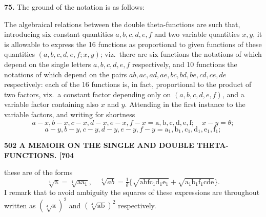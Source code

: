 \documentclass[11pt]{article}
\begin{document}
\medskip
\textbf{75.} The ground of the notation is as follows:

The algebraical relations between the double theta-functions are such that, introducing six constant quantities $a,b,c,d,e,f$ and two variable quantities $x,y$, it is allowable to express the 16 functions as proportional to given functions of these quantities $(a,b,c,d,e,f; x,y)$; viz.\ there are six functions the notations of which depend on the single letters $a,b,c,d,e,f$ respectively, and 10 functions the notations of which depend on the pairs $ab, ac, ad, ae, bc, bd, be, cd, ce, de$ respectively: each of the 16 functions is, in fact, proportional to the product of two factors, viz.\ a constant factor depending only on $(a,b,c,d,e,f)$, and a variable factor containing also $x$ and $y$. Attending in the first instance to the variable factors, and writing for shortness
\[
a-x, b-x, c-x, d-x, e-x, f-x = \mathrm{a}, \mathrm{b}, \mathrm{c}, \mathrm{d}, \mathrm{e}, \mathrm{f};\quad x-y = \theta;
\]
\[
a-y, b-y, c-y, d-y, e-y, f-y = \mathrm{a}_1, \mathrm{b}_1, \mathrm{c}_1, \mathrm{d}_1, \mathrm{e}_1, \mathrm{f}_1;
\]

\bigskip
\noindent\textbf{502 \hfill A MEMOIR ON THE SINGLE AND DOUBLE THETA-FUNCTIONS. \hfill [704}

\medskip
these are of the forms
\[
\sqrt[4]{\mathrm{a}} = \sqrt[4]{\mathrm{a}\mathrm{a}_1},\quad \sqrt[4]{ab} = \tfrac{1}{\theta}\{\sqrt{\mathrm{a}\mathrm{b}\mathrm{f}\mathrm{c}_1\mathrm{d}_1\mathrm{e}_1} + \sqrt{\mathrm{a}_1\mathrm{b}_1\mathrm{f}_1\mathrm{c}\mathrm{d}\mathrm{e}}\}.
\]
I remark that to avoid ambiguity the squares of these expressions are throughout written as $(\sqrt[4]{\mathrm{a}})^2$ and $(\sqrt[4]{\mathrm{ab}})^2$ respectively.
\end{document}
